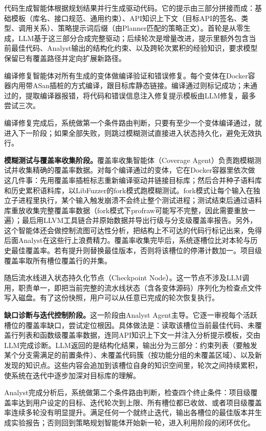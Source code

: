 代码生成智能体根据规划结果并行生成驱动代码。它的提示由三部分拼接而成：基础模板（库名、接口规范、通用约束）、API知识上下文（目标API的签名、类型、调用关系）、策略提示词后缀（由Planner匹配的策略正文）。首轮是从零生成，LLM基于这三部分合成完整驱动；后续轮次是增量改进，提示里额外包含当前最佳代码、Analyst输出的结构化约束、以及跨轮次累积的经验知识，要求模型保留已有覆盖路径并定向扩展新路径。

编译修复智能体对所有生成的变体做编译验证和错误修复。每个变体在Docker容器内用带ASan插桩的方式编译，跟目标库静态链接。编译通过则标记成功；未通过的，提取编译器报错，将代码和错误信息注入修复提示模板由LLM修复，最多尝试三次。

编译修复完成后，系统做第一个条件路由判断，只要有至少一个变体编译通过，就进入下一阶段；如果全部失败，则跳过模糊测试直接进入状态持久化，避免无效执行。

\textbf{模糊测试与覆盖率收集阶段。}覆盖率收集智能体（Coverage Agent）负责跑模糊测试并收集精确的覆盖率数据。对每个编译通过的变体，它在Docker容器里依次做这几件事：先用覆盖率插桩标志重新编译驱动并链接目标库；然后合并种子语料库和历史累积语料库，以LibFuzzer的fork模式跑模糊测试。fork模式让每个输入在独立子进程里执行，某个输入触发崩溃不会终止整个测试进程；测试结束后通过语料库重放收集完整覆盖率数据（fork模式下profraw可能写不完整，因此需要重放一遍）；最后用LLVM工具链合并原始数据并导出行级与分支级覆盖率报告。另外，这个智能体还会做控制流图可达性分析，把结构上不可达的代码行标记出来，免得后面Analyst在这些行上浪费精力。覆盖率收集完毕后，系统逐槽位比对本轮与历史最佳覆盖率。若有提升则替换最佳版本，否则将该槽位的停滞计数加一。项目级覆盖率取所有槽位覆盖行的并集。

随后流水线进入状态持久化节点（Checkpoint Node）。这一节点不涉及LLM调用，职责单一，即把当前完整的流水线状态（含各变体源码）序列化为检查点文件写入磁盘。有了这份快照，用户可以从任意已完成的轮次恢复执行。

\textbf{缺口诊断与迭代控制阶段。}这一阶段由Analyst Agent主导。它逐一审视每个活跃槽位的覆盖率缺口，尝试定位根因。具体做法是：读取该槽位当前最佳代码、未覆盖行列表和函数级覆盖率数据，连同API知识上下文一并注入分析提示模板，交由LLM完成诊断。LLM返回的是结构化结果，输出分为三部分：约束列表（要触发某个分支需满足的前置条件）、未覆盖代码簇（按功能分组的未覆盖区域）、以及新发现的知识点。这些内容会追加到该槽位自身的知识空间里，轮次之间持续累积，使系统在迭代中逐步加深对目标库的理解。

Analyst完成分析后，系统做第二个条件路由判断，检查四个终止条件：项目级覆盖率达到用户设定的目标、迭代轮次到上限、所有槽位都已收敛、或者项目级覆盖率连续多轮没有明显提升。满足任何一个就终止迭代，输出各槽位的最佳版本并生成实验报告；否则回到策略规划智能体开始新一轮，进入利用阶段的闭环优化。

